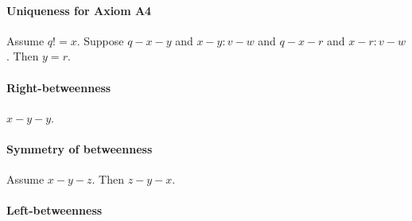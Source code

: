 \documentclass{article}
\begin{document}
  \paragraph{Uniqueness for Axiom A4}

  \begin{forthel}
    \begin{lemma}[L2o12]
      Assume $q != x$. Suppose $q-x-y$ and $x-y : v-w$ and $q-x-r$ and $x-r : v-w$. Then $y = r$.
    \end{lemma}
  \end{forthel}


  \paragraph{Right-betweenness}

  \begin{forthel}
    \begin{lemma}[L3o1]
      $x-y-y$.
    \end{lemma}
  \end{forthel}


  \paragraph{Symmetry of betweenness}

  \begin{forthel}
    \begin{lemma}[L3o2]
      Assume $x-y-z$. Then $z-y-x$.
    \end{lemma}
  \end{forthel}


  \paragraph{Left-betweenness}
\end{document}

